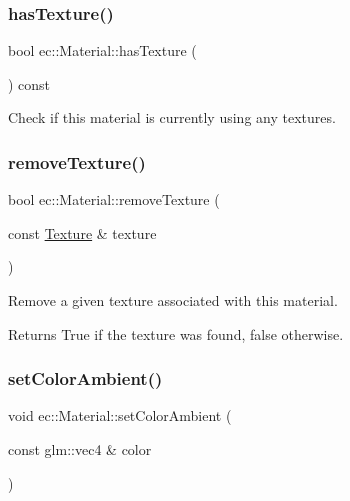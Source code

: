 \subsubsection{\texorpdfstring{has\+Texture()}{hasTexture()}}
{\footnotesize\ttfamily bool ec\+::\+Material\+::has\+Texture (\begin{DoxyParamCaption}{ }\end{DoxyParamCaption}) const}



Check if this material is currently using any textures. 

\mbox{\label{classec_1_1_material_aa22a00f6a91e7f0daff6885e4e0944d3}} 
\subsubsection{\texorpdfstring{remove\+Texture()}{removeTexture()}}
{\footnotesize\ttfamily bool ec\+::\+Material\+::remove\+Texture (\begin{DoxyParamCaption}\item[{const \mbox{\hyperlink{classec_1_1_texture}{Texture}} \&}]{texture }\end{DoxyParamCaption})}



Remove a given texture associated with this material. 

\begin{DoxyReturn}{Returns}
True if the texture was found, false otherwise. 
\end{DoxyReturn}
\mbox{\label{classec_1_1_material_afdd82441b5b2168161a17824e4a90f6f}} 
\subsubsection{\texorpdfstring{set\+Color\+Ambient()}{setColorAmbient()}\hspace{0.1cm}{\footnotesize\ttfamily [1/2]}}
{\footnotesize\ttfamily void ec\+::\+Material\+::set\+Color\+Ambient (\begin{DoxyParamCaption}\item[{const glm\+::vec4 \&}]{color }\end{DoxyParamCaption})}



